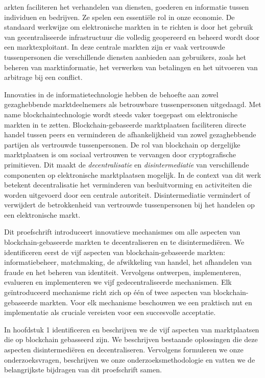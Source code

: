 {

arkten faciliteren het verhandelen van diensten, goederen en informatie tussen individuen en bedrijven.
Ze spelen een essentiële rol in onze economie.
De standaard werkwijze om elektronische markten in te richten is door het gebruik van gecentraliseerde infrastructuur die volledig geopereerd en beheerd wordt door een marktexploitant.
In deze centrale markten zijn er vaak vertrouwde tussenpersonen die verschillende diensten aanbieden aan gebruikers, zoals het beheren van marktinformatie, het verwerken van betalingen en het uitvoeren van arbitrage bij een conflict.

Innovaties in de informatietechnologie hebben de behoefte aan zowel gezaghebbende marktdeelnemers als betrouwbare tussenpersonen uitgedaagd.
Met name blockchaintechnologie wordt steeds vaker toegepast om elektronische markten in te zetten.
Blockchain-gebaseerde marktplaatsen faciliteren directe handel tussen peers en verminderen de afhankelijkheid van zowel gezaghebbende partijen als vertrouwde tussenpersonen.
De rol van blockchain op dergelijke marktplaatsen is om sociaal vertrouwen te vervangen door cryptografische primitieven.
Dit maakt de \emph{decentralisatie} en \emph{disintermediatie} van verschillende componenten op elektronische marktplaatsen mogelijk.
In de context van dit werk betekent decentralisatie het verminderen van besluitvorming en activiteiten die worden uitgevoerd door een centrale autoriteit.
Disintermediatie vermindert of verwijdert de betrokkenheid van vertrouwde tussenpersonen bij het handelen op een elektronische markt.

Dit proefschrift introduceert innovatieve mechanismes om alle aspecten van blockchain-gebaseerde markten te decentraliseren en te disintermediëren.
We identificeren eerst de vijf aspecten van blockchain-gebaseerde markten: informatiebeheer, matchmaking, de afwikkeling van handel, het afhandelen van fraude en het beheren van identiteit.
Vervolgens ontwerpen, implementeren, evalueren en implementeren we vijf gedecentraliseerde mechanismen.
Elk geïntroduceerd mechanisme richt zich op één of twee aspecten van blockchain-gebaseerde markten.
Voor elk mechanisme beschouwen we een praktisch nut en implementatie als cruciale vereisten voor een succesvolle acceptatie.

In hoofdstuk 1 identificeren en beschrijven we de vijf aspecten van marktplaatsen die op blockchain gebasseerd zijn.
We beschrijven bestaande oplossingen die deze aspecten disintermediëren en decentraliseren.
Vervolgens formuleren we onze onderzoeksvragen, beschrijven we onze onderzoeksmethodologie en vatten we de belangrijkste bijdragen van dit proefschrift samen.

}
